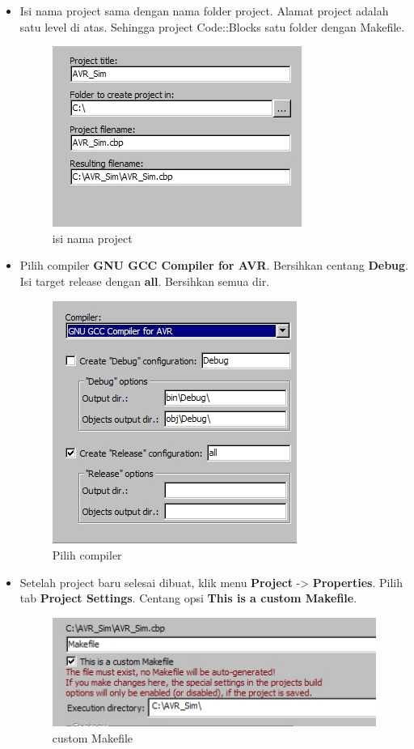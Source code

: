 \documentclass[12pt,]{article}
\begin{document}
\begin{itemize}
		\item Isi nama project sama dengan nama folder project.
		Alamat project adalah satu level di atas.
		Sehingga project Code::Blocks satu folder dengan Makefile.
		\begin{figure}[H]
			\centering
			\includegraphics[width=0.5\linewidth]{images/hello_a3}
			\caption{isi nama project}
		\end{figure}
		
		\newpage
		\item Pilih compiler \textbf{GNU GCC Compiler for AVR}.
		Bersihkan centang \textbf{Debug}.
		Isi target release dengan \textbf{all}.
		Bersihkan semua dir.
		\begin{figure}[H]
			\centering
			\includegraphics[width=0.5\linewidth]{images/hello_a4}
			\caption{Pilih compiler}
		\end{figure}
	
		\item Setelah project baru selesai dibuat, klik menu \textbf{Project} -> \textbf{Properties}.
		Pilih tab \textbf{Project Settings}.
		Centang opsi \textbf{This is a custom Makefile}.
		\begin{figure}[H]
			\centering
			\includegraphics[width=0.5\linewidth]{images/hello_a5}
			\caption{custom Makefile}
		\end{figure}
		

\end{itemize}
\end{document}
